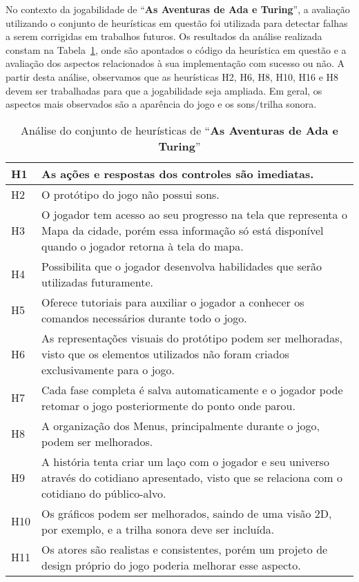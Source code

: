 No contexto da jogabilidade de “\textbf{As Aventuras de Ada e Turing}”, a avaliação utilizando o conjunto de heurísticas em questão foi utilizada para detectar falhas a serem corrigidas em trabalhos futuros. Os resultados da análise realizada constam na Tabela~\ref{tab:analise_heuristica}, onde são apontados o código da heurística em questão e a avaliação dos aspectos relacionados à sua implementação com sucesso ou não. A partir desta análise, observamos que as heurísticas H2, H6, H8, H10, H16 e H8 devem ser trabalhadas para que a jogabilidade seja ampliada. Em geral, os aspectos mais observados são a aparência do jogo e os sons/trilha sonora. 

\begin{table}[H]
\centering
\caption{Análise do conjunto de heurísticas de “\textbf{As Aventuras de Ada e Turing}”}
\label{tab:analise_heuristica}
\begin{tabular}{|l|p{15.5cm}|}
\hline
H1  & As ações e respostas dos controles são imediatas. \\ \hline
H2  & O protótipo do jogo não possui sons. \\ \hline
H3  & O jogador tem acesso ao seu progresso na tela que representa o Mapa da cidade, porém essa informação só está disponível quando o jogador retorna à tela do mapa. \\ \hline
H4  & Possibilita que o jogador desenvolva habilidades que serão utilizadas futuramente. \\ \hline
H5  & Oferece tutoriais para auxiliar o jogador a conhecer os comandos necessários durante todo o jogo. \\ \hline
H6  & As representações visuais do protótipo podem ser melhoradas, visto que os elementos utilizados não foram criados exclusivamente para o jogo. \\ \hline
H7  & Cada fase completa é salva automaticamente e o jogador pode retomar o jogo posteriormente do ponto onde parou. \\ \hline
H8  & A organização dos Menus, principalmente durante o jogo, podem ser melhorados. \\ \hline
H9  & A história tenta criar um laço com o jogador e seu universo através do cotidiano apresentado, visto que se relaciona com o cotidiano do público-alvo. \\ \hline
H10 & Os gráficos podem ser melhorados, saindo de uma visão 2D, por exemplo, e a trilha sonora deve ser incluída. \\ \hline
H11 & Os atores são realistas e consistentes, porém um projeto de design próprio do jogo poderia melhorar esse aspecto. \\ \hline

\end{tabular}
\end{table}
